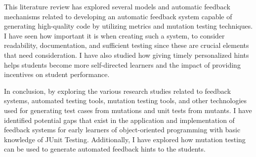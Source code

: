 This literature review has explored several models and automatic feedback mechanisms related to developing an automatic feedback system capable of generating high-quality code by utilizing metrics and mutation testing techniques. I have seen how important it is when creating such a system, to consider readability, documentation, and sufficient testing since these are crucial elements that need consideration. I have also studied how giving timely personalized hints helps students become more self-directed learners and the impact of providing incentives on student performance. \par 
In conclusion, by exploring the various research studies related to feedback systems, automated testing tools, mutation testing tools, and other technologies used for generating test cases from mutations and unit tests from mutants. I have identified potential gaps that exist in the application and implementation of feedback systems for early learners of object-oriented programming with basic knowledge of JUnit Testing. Additionally, I have explored how mutation testing can be used to generate automated feedback hints to the students.





